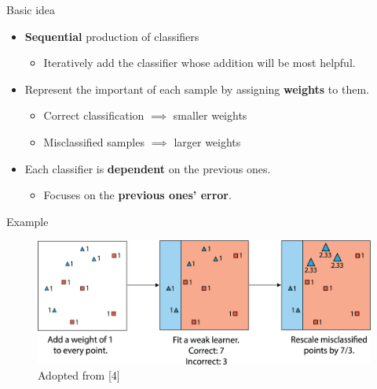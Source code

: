 \documentclass[serif, aspectratio=169]{beamer}
\begin{document}
\begin{frame}{Basic idea}
    \begin{itemize}
        \itemsep1em
        \justifying
        \item \textbf{Sequential} production of classifiers
        \begin{itemize}
            \item Iteratively add the classifier whose addition will be most helpful.
        \end{itemize}
        \item Represent the important of each sample by assigning \textbf{weights} to them.
        \begin{itemize}
            \itemsep0.25em
            \item Correct classification $\implies$ smaller weights
            \item Misclassified samples $\implies$ larger weights
        \end{itemize}
        \item Each classifier is \textbf{dependent} on the previous ones.
        \begin{itemize}
            \item Focuses on the \textbf{previous ones’ error}.
        \end{itemize}
    \end{itemize}
\end{frame}

\begin{frame}{Example}
    \begin{center}
        \begin{figure}
            \includegraphics[width=\linewidth]{pic/adaboost_e1.png}
            {\scriptsize Adopted from [4]}
        \end{figure}
        \endminipage
    \end{center}
\end{frame}
\end{document}
